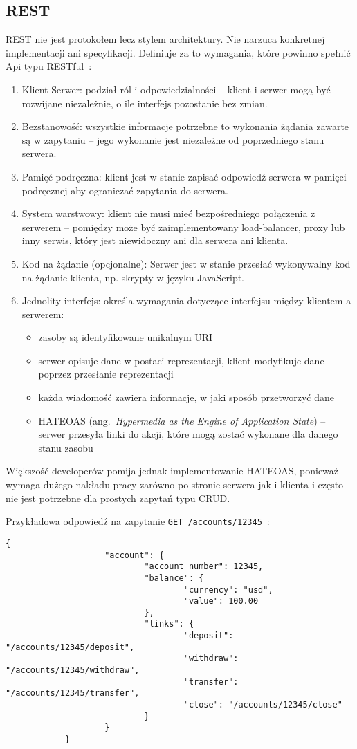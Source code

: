 	\subsection{REST}
		REST nie jest protokołem lecz stylem architektury.
		Nie narzuca konkretnej implementacji ani specyfikacji. Definiuje za to wymagania, które powinno spełnić Api typu RESTful~\cite{RESTful}:
		\begin{enumerate}
			\item Klient-Serwer: podział ról i odpowiedzialności -- klient i serwer mogą być rozwijane niezależnie, o ile interfejs pozostanie bez zmian.
			\item Bezstanowość: wszystkie informacje potrzebne to wykonania żądania zawarte są w zapytaniu -- jego wykonanie jest niezależne od poprzedniego stanu serwera.
			\item Pamięć podręczna: klient jest w stanie zapisać odpowiedź serwera w pamięci podręcznej aby ograniczać zapytania do serwera.
			\item System warstwowy: klient nie musi mieć bezpośredniego połączenia z serwerem
				-- pomiędzy może być zaimplementowany load-balancer, proxy lub inny serwis, który jest niewidoczny ani dla serwera ani klienta.
			\item Kod na żądanie (opcjonalne): Serwer jest w stanie przesłać wykonywalny kod na żądanie klienta, np. skrypty w języku JavaScript.
			\item Jednolity interfejs: określa wymagania dotyczące interfejsu między klientem a serwerem:
				\begin{itemize}
					\item zasoby są identyfikowane unikalnym URI
					\item serwer opisuje dane w postaci reprezentacji, klient modyfikuje dane poprzez przesłanie reprezentacji
					\item każda wiadomość zawiera informacje, w jaki sposób przetworzyć dane
					\item HATEOAS (ang.\ \emph{Hypermedia as the Engine of Application State})
						-- serwer przesyła linki do akcji, które mogą zostać wykonane dla danego stanu zasobu
				\end{itemize}
		\end{enumerate}

		Większość developerów pomija jednak implementowanie HATEOAS, ponieważ wymaga dużego nakładu pracy zarówno po stronie serwera jak i klienta
		i często nie jest potrzebne dla prostych zapytań typu CRUD.

		Przykładowa odpowiedź na zapytanie \verb|GET /accounts/12345|~\cite{RestMsg}:
		\begin{lstlisting}[label=lst:restRes]
			{
					"account": {
							"account_number": 12345,
							"balance": {
									"currency": "usd",
									"value": 100.00
							},
							"links": {
									"deposit": "/accounts/12345/deposit",
									"withdraw": "/accounts/12345/withdraw",
									"transfer": "/accounts/12345/transfer",
									"close": "/accounts/12345/close"
							}
					}
			}
		\end{lstlisting}
		

